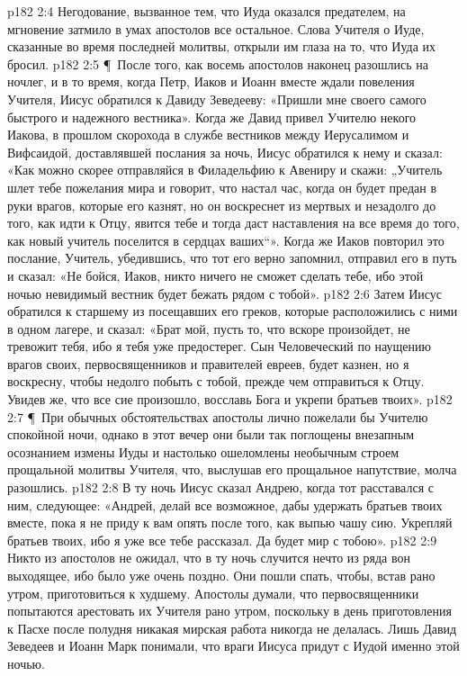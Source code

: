 \vs p182 2:4 Негодование, вызванное тем, что Иуда оказался предателем, на мгновение затмило в умах апостолов все остальное. Слова Учителя о Иуде, сказанные во время последней молитвы, открыли им глаза на то, что Иуда их бросил.
\vs p182 2:5 \P\ После того, как восемь апостолов наконец разошлись на ночлег, и в то время, когда Петр, Иаков и Иоанн вместе ждали повеления Учителя, Иисус обратился к Давиду Зеведееву: «Пришли мне своего самого быстрого и надежного вестника». Когда же Давид привел Учителю некого Иакова, в прошлом скорохода в службе вестников между Иерусалимом и Вифсаидой, доставлявшей послания за ночь, Иисус обратился к нему и сказал: «Как можно скорее отправляйся в Филадельфию к Авениру и скажи: „Учитель шлет тебе пожелания мира и говорит, что настал час, когда он будет предан в руки врагов, которые его казнят, но он воскреснет из мертвых и незадолго до того, как идти к Отцу, явится тебе и тогда даст наставления на все время до того, как новый учитель поселится в сердцах ваших“». Когда же Иаков повторил это послание, Учитель, убедившись, что тот его верно запомнил, отправил его в путь и сказал: «Не бойся, Иаков, никто ничего не сможет сделать тебе, ибо этой ночью невидимый вестник будет бежать рядом с тобой».
\vs p182 2:6 Затем Иисус обратился к старшему из посещавших его греков, которые расположились с ними в одном лагере, и сказал: «Брат мой, пусть то, что вскоре произойдет, не тревожит тебя, ибо я тебя уже предостерег. Сын Человеческий по наущению врагов своих, первосвященников и правителей евреев, будет казнен, но я воскресну, чтобы недолго побыть с тобой, прежде чем отправиться к Отцу. Увидев же, что все сие произошло, восславь Бога и укрепи братьев твоих».
\vs p182 2:7 \P\ При обычных обстоятельствах апостолы лично пожелали бы Учителю спокойной ночи, однако в этот вечер они были так поглощены внезапным осознанием измены Иуды и настолько ошеломлены необычным строем прощальной молитвы Учителя, что, выслушав его прощальное напутствие, молча разошлись.
\vs p182 2:8 В ту ночь Иисус сказал Андрею, когда тот расставался с ним, следующее: «Андрей, делай все возможное, дабы удержать братьев твоих вместе, пока я не приду к вам опять после того, как выпью чашу сию. Укрепляй братьев твоих, ибо я уже все тебе рассказал. Да будет мир с тобою».
\vs p182 2:9 Никто из апостолов не ожидал, что в ту ночь случится нечто из ряда вон выходящее, ибо было уже очень поздно. Они пошли спать, чтобы, встав рано утром, приготовиться к худшему. Апостолы думали, что первосвященники попытаются арестовать их Учителя рано утром, поскольку в день приготовления к Пасхе после полудня никакая мирская работа никогда не делалась. Лишь Давид Зеведеев и Иоанн Марк понимали, что враги Иисуса придут с Иудой именно этой ночью.
